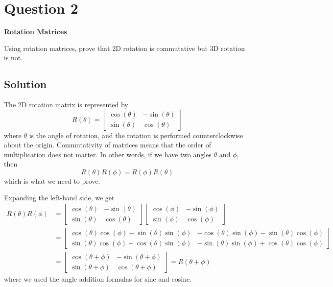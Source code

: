 \section*{Question 2}

\textbf{Rotation Matrices}

Using rotation matrices, prove that 2D rotation is commutative but 3D rotation is not.

\subsection*{Solution}

The 2D rotation matrix is represented by
\begin{equation*}
    R(\theta) = \begin{bmatrix}
        \cos(\theta) & -\sin(\theta) \\
        \sin(\theta) & \cos(\theta)
    \end{bmatrix}
\end{equation*}
where \( \theta \) is the angle of rotation, and the rotation is performed counterclockwise about the origin.
Commutativity of matrices means that the order of multiplication does not matter.
In other words, if we have two angles \( \theta \) and \( \phi \), then
\begin{equation*}
    R(\theta)R(\phi) = R(\phi)R(\theta)
\end{equation*}
which is what we need to prove.

Expanding the left-hand side, we get
\begin{align*}
    R(\theta)R(\phi)
     & =
    \begin{bmatrix}
        \cos(\theta) & -\sin(\theta) \\
        \sin(\theta) & \cos(\theta)
    \end{bmatrix}
    \begin{bmatrix}
        \cos(\phi) & -\sin(\phi) \\
        \sin(\phi) & \cos(\phi)
    \end{bmatrix}
    \\ & =
    \begin{bmatrix}
        \cos(\theta)\cos(\phi) - \sin(\theta)\sin(\phi) & -\cos(\theta)\sin(\phi) - \sin(\theta)\cos(\phi) \\
        \sin(\theta)\cos(\phi) + \cos(\theta)\sin(\phi) & -\sin(\theta)\sin(\phi) + \cos(\theta)\cos(\phi)
    \end{bmatrix}
    \\ & =
    \begin{bmatrix}
        \cos(\theta + \phi) & -\sin(\theta + \phi) \\
        \sin(\theta + \phi) & \cos(\theta + \phi)
    \end{bmatrix}
    =
    R(\theta + \phi)
\end{align*}
where we used the angle addition formulas for sine and cosine.

